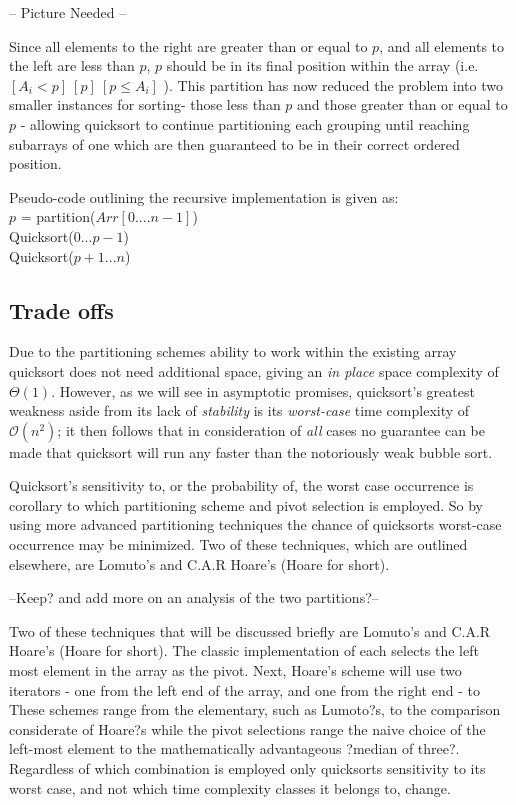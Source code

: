 \documentclass[11pt,letterpaper]{report}
\begin{document}
  -- Picture Needed --

Since all elements to the right are greater than or equal to $p$, and all elements to the left are less than $p$, $p$ should be in its final position within the array (i.e. $[A_i < p]\ [p]\ [p \leq A_i ]$ ). This partition has now reduced the problem into two smaller instances for sorting- those less than $p$ and those greater than or equal to $p$ - allowing quicksort to continue partitioning each grouping until reaching subarrays of one which are then guaranteed to be in their correct ordered position.

Pseudo-code outlining the recursive implementation is given as:\\
$p$ = partition($Arr[0....n-1]$)\\
Quicksort($0...p-1$)\\
Quicksort($p+1...n$)\\

\subsection*{Trade offs}
Due to the partitioning schemes ability to work within the existing array quicksort does not need additional space, giving an \emph{in place} space complexity of $\Theta(1)$. However, as we will see in asymptotic promises, quicksort's greatest weakness aside from its lack of \emph{stability} is its \emph{worst-case} time complexity of $\mathcal{O}(n^2)$; it then follows that in consideration of \emph{all} cases no guarantee can be made that quicksort will run any faster than the notoriously weak bubble sort.

Quicksort's sensitivity to, or the probability of, the worst case occurrence is corollary to which partitioning scheme and pivot selection is employed. So by using more advanced partitioning techniques the chance of quicksorts worst-case occurrence may be minimized. Two of these techniques, which are outlined elsewhere, are Lomuto's and C.A.R Hoare's (Hoare for short).

--Keep? and add more on an analysis of the two partitions?--

Two of these techniques that will be discussed briefly are Lomuto's and C.A.R Hoare's (Hoare for short). The classic implementation of each selects the left most element in the array as the pivot. Next, Hoare's scheme will use two iterators - one from the left end of the array, and one from the right end - to These schemes range from the elementary, such as Lumoto?s, to the comparison considerate of Hoare?s while the pivot selections range the naive choice of the left-most element to the mathematically advantageous ?median of three?. Regardless of which combination is employed only quicksorts sensitivity to its worst case, and not which time complexity classes it belongs to, change.
\end{document}
